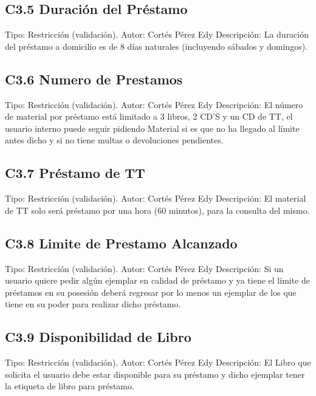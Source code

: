 \subsection{C3.5 Duración del Préstamo}
	\UCli Tipo: Restricción (validación).
	\UCli Autor: Cortés Pérez Edy
	\UCli Descripción: La duración del préstamo a domicilio es de 8 días naturales (incluyendo sábados y domingos).
	
\subsection{C3.6 Numero de Prestamos}
	\UCli Tipo: Restricción (validación).
	\UCli Autor: Cortés Pérez Edy
	\UCli Descripción: El número de material por préstamo está limitado a 3 libros, 2 CD'S y un CD de TT, el usuario interno puede seguir pidiendo Material si es que no ha llegado al límite antes dicho y si no tiene multas o devoluciones pendientes.
	
\subsection{C3.7 Préstamo de TT}
	\UCli Tipo: Restricción (validación).
	\UCli Autor: Cortés Pérez Edy
	\UCli Descripción: El material de TT solo será préstamo por una hora (60 minutos), para la consulta del mismo.

\subsection{C3.8 Limite de Prestamo Alcanzado}
	\UCli Tipo: Restricción (validación).
	\UCli Autor: Cortés Pérez Edy
	\UCli Descripción: Si un usuario quiere pedir algún ejemplar en calidad de préstamo y ya tiene el límite de préstamos en su posesión deberá regresar por lo menos un ejemplar de los que tiene en su poder para realizar dicho préstamo.

\subsection{C3.9 Disponibilidad de Libro}
	\UCli Tipo: Restricción (validación).
	\UCli Autor: Cortés Pérez Edy
	\UCli Descripción: El Libro que solicita el usuario debe estar disponible para su préstamo y dicho ejemplar tener la etiqueta de libro para préstamo.
	
